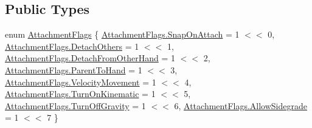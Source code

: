\subsection*{Public Types}
\begin{DoxyCompactItemize}
\item 
enum \mbox{\hyperlink{class_valve_1_1_v_r_1_1_interaction_system_1_1_hand_a61701f82b8f3fac8818954ec71804cb5}{Attachment\+Flags}} \{ \newline
\mbox{\hyperlink{class_valve_1_1_v_r_1_1_interaction_system_1_1_hand_a61701f82b8f3fac8818954ec71804cb5aa9239842688257a228aa37c854ac7e19}{Attachment\+Flags.\+Snap\+On\+Attach}} = 1 $<$$<$ 0, 
\mbox{\hyperlink{class_valve_1_1_v_r_1_1_interaction_system_1_1_hand_a61701f82b8f3fac8818954ec71804cb5a90605d47fc2d1a137f37ca3c01c9bda7}{Attachment\+Flags.\+Detach\+Others}} = 1 $<$$<$ 1, 
\mbox{\hyperlink{class_valve_1_1_v_r_1_1_interaction_system_1_1_hand_a61701f82b8f3fac8818954ec71804cb5a8a58e6540a6a37ae53f78af6e282acb2}{Attachment\+Flags.\+Detach\+From\+Other\+Hand}} = 1 $<$$<$ 2, 
\mbox{\hyperlink{class_valve_1_1_v_r_1_1_interaction_system_1_1_hand_a61701f82b8f3fac8818954ec71804cb5a751b8279634ea59f595145c90a54d8bc}{Attachment\+Flags.\+Parent\+To\+Hand}} = 1 $<$$<$ 3, 
\newline
\mbox{\hyperlink{class_valve_1_1_v_r_1_1_interaction_system_1_1_hand_a61701f82b8f3fac8818954ec71804cb5ae7e5863d4a4aa5eabb7b344b48cf7234}{Attachment\+Flags.\+Velocity\+Movement}} = 1 $<$$<$ 4, 
\mbox{\hyperlink{class_valve_1_1_v_r_1_1_interaction_system_1_1_hand_a61701f82b8f3fac8818954ec71804cb5a8b6d63187f9074786daaf44d2e4b657d}{Attachment\+Flags.\+Turn\+On\+Kinematic}} = 1 $<$$<$ 5, 
\mbox{\hyperlink{class_valve_1_1_v_r_1_1_interaction_system_1_1_hand_a61701f82b8f3fac8818954ec71804cb5adbe4d6b99e251293baeec647a3f392a2}{Attachment\+Flags.\+Turn\+Off\+Gravity}} = 1 $<$$<$ 6, 
\mbox{\hyperlink{class_valve_1_1_v_r_1_1_interaction_system_1_1_hand_a61701f82b8f3fac8818954ec71804cb5aa93ce0af2ac218d8e0358aeb1bece878}{Attachment\+Flags.\+Allow\+Sidegrade}} = 1 $<$$<$ 7
 \}
\end{DoxyCompactItemize}
